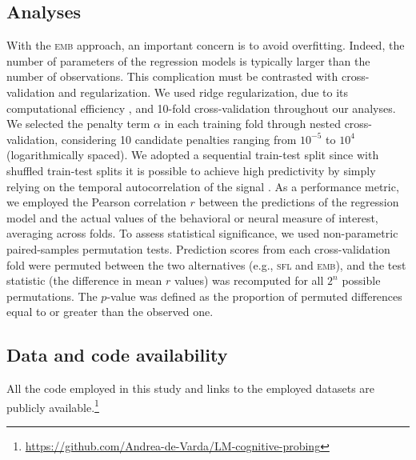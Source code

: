 \documentclass[11pt]{article}
\begin{document}
\subsection{Analyses}

With the \textsc{emb} approach, an important concern is to avoid overfitting. Indeed, the number of parameters of the regression models is typically larger than the number of observations. This complication must be contrasted with cross-validation and regularization. We used ridge regularization, due to its computational efficiency \citep{ridge}, and 10-fold cross-validation throughout our analyses. We selected the penalty term $\alpha$ in each training fold through nested cross-validation, considering 10 candidate penalties ranging from $10^{-5}$ to $10^4$ (logarithmically spaced). We adopted a sequential train-test split since with shuffled train-test splits it is possible to achieve high predictivity by simply relying on the temporal autocorrelation of the signal \citep{feghhi2024large, kauf2024lexical}. As a performance metric, we employed the Pearson correlation $r$ between the predictions of the regression model and the actual values of the behavioral or neural measure of interest, averaging across folds. To assess statistical significance, we used non-parametric paired-samples permutation tests. Prediction scores from each cross-validation fold were permuted between the two alternatives (e.g., \textsc{sfl} and \textsc{emb}), and the test statistic (the difference in mean $r$ values) was recomputed for all $2^n$ possible permutations. The $p$-value was defined as the proportion of permuted differences equal to or greater than the observed one. 

\subsection{Data and code availability}

All the code employed in this study and links to the employed datasets are publicly available.\footnote{\href{https://github.com/Andrea-de-Varda/LM-cognitive-probing}{https://github.com/Andrea-de-Varda/LM-cognitive-probing}} 


\FloatBarrier



\end{document}
